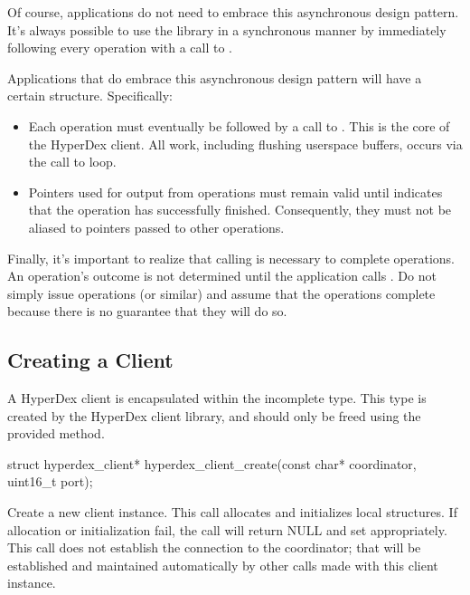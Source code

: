 Of course, applications do not need to embrace this asynchronous design pattern.
It's always possible to use the library in a synchronous manner by immediately
following every operation with a call to .

Applications that do embrace this asynchronous design pattern will have a
certain structure.  Specifically:

\begin{itemize}
\item Each operation must eventually be followed by a call to
.  This is the core of the HyperDex client.  All
work, including flushing userspace buffers, occurs via the call to loop.

\item Pointers used for output from operations must remain valid until
 indicates that the operation has successfully
finished.  Consequently, they must not be aliased to pointers passed to other
operations.
\end{itemize}

Finally, it's important to realize that calling  is
necessary to complete operations.  An operation's outcome is not determined
until the application calls .  Do not simply issue
 operations (or similar) and assume that the
operations complete because there is no guarantee that they will do so.

\subsection{Creating a Client}
\label{sec:api:c:client:create}

A HyperDex client is encapsulated within the incomplete  type.  This type is created by the HyperDex client library,
and should only be freed using the provided method.

\funcsep
\begin{ccode}
struct hyperdex_client*
hyperdex_client_create(const char* coordinator, uint16_t port);
\end{ccode}
\funcdesc Create a new client instance.  This call allocates and initializes
local structures.  If allocation or initialization fail, the call will return
NULL and set  appropriately.  This call does not establish the
connection to the coordinator; that will be established and maintained
automatically by other calls made with this client instance.

